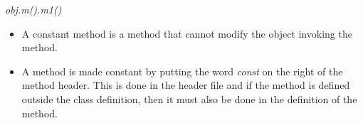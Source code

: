 \documentclass[
]{article}
\begin{document}
\emph{obj.m().m1()}

\begin{itemize}
\item
  A constant method is a method that cannot modify the object invoking
  the method.
\item
  A method is made constant by putting the word \emph{const} on the
  right of the method header. This is done in the header file and if the
  method is defined outside the class definition, then it must also be
  done in the definition of the method.
\end{itemize}
\end{document}
